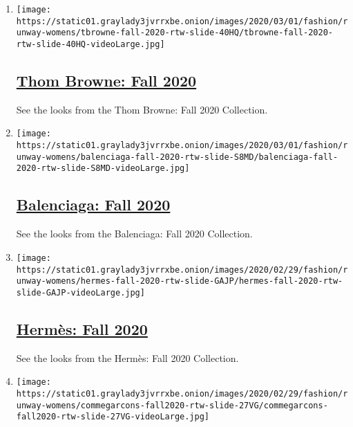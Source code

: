 \begin{enumerate}
\def\labelenumi{\arabic{enumi}.}
\item
  \texttt{[image: https://static01.graylady3jvrrxbe.onion/images/2020/03/01/fashion/runway-womens/tbrowne-fall-2020-rtw-slide-40HQ/tbrowne-fall-2020-rtw-slide-40HQ-videoLarge.jpg]}

  \hypertarget{thom-browne-fall-2020}{%
  \subsection{\texorpdfstring{\href{/slideshow/2020/03/01/fashion/runway-womens/thom-browne-fall-2020.html}{Thom
  Browne: Fall
  2020}}{Thom Browne: Fall 2020}}\label{thom-browne-fall-2020}}

  See the looks from the Thom Browne: Fall 2020 Collection.
\item
  \texttt{[image: https://static01.graylady3jvrrxbe.onion/images/2020/03/01/fashion/runway-womens/balenciaga-fall-2020-rtw-slide-S8MD/balenciaga-fall-2020-rtw-slide-S8MD-videoLarge.jpg]}

  \hypertarget{balenciaga-fall-2020}{%
  \subsection{\texorpdfstring{\href{/slideshow/2020/03/01/fashion/runway-womens/balenciaga-fall-2020.html}{Balenciaga:
  Fall 2020}}{Balenciaga: Fall 2020}}\label{balenciaga-fall-2020}}

  See the looks from the Balenciaga: Fall 2020 Collection.
\item
  \texttt{[image: https://static01.graylady3jvrrxbe.onion/images/2020/02/29/fashion/runway-womens/hermes-fall-2020-rtw-slide-GAJP/hermes-fall-2020-rtw-slide-GAJP-videoLarge.jpg]}

  \hypertarget{hermuxe8s-fall-2020}{%
  \subsection{\texorpdfstring{\href{/slideshow/2020/02/29/fashion/runway-womens/hermes-fall-2020.html}{Hermès:
  Fall 2020}}{Hermès: Fall 2020}}\label{hermuxe8s-fall-2020}}

  See the looks from the Hermès: Fall 2020 Collection.
\item
  \texttt{[image: https://static01.graylady3jvrrxbe.onion/images/2020/02/29/fashion/runway-womens/commegarcons-fall2020-rtw-slide-27VG/commegarcons-fall2020-rtw-slide-27VG-videoLarge.jpg]}


\end{enumerate}
